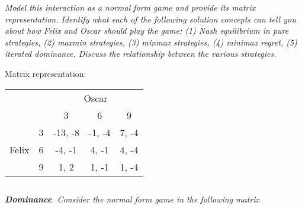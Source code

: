 \documentclass[12pt]{amsart}
\begin{document}
\textit{Model this interaction as a normal form game and provide its matrix representation.
	Identify what each of the following solution concepts can tell you about how Felix and Oscar
	should play the game: (1) Nash equilibrium in pure strategies, (2) maxmin strategies, (3)
	minmax strategies, (4) minimax regret, (5) iterated dominance. Discuss the relationship
	between the various strategies.}
	
	Matrix representation: \\
	
	\begin{center}
		\def\arraystretch{1.25}%
		\begin{tabular}{ccccc}
			&                        & \multicolumn{3}{c}{Oscar}                                                               \\
			& \multicolumn{1}{c|}{}  & \multicolumn{1}{c|}{3}       & \multicolumn{1}{c|}{6}      & \multicolumn{1}{c|}{9}     \\ \cline{2-5} 
			\multirow{3}{*}{Felix} & \multicolumn{1}{c|}{3} & \multicolumn{1}{c|}{-13, -8} & \multicolumn{1}{c|}{-1, -4} & \multicolumn{1}{c|}{7, -4} \\ \cline{2-5} 
			& \multicolumn{1}{c|}{6} & \multicolumn{1}{c|}{-4, -1}  & \multicolumn{1}{c|}{4, -1}  & \multicolumn{1}{c|}{4, -4} \\ \cline{2-5} 
			& \multicolumn{1}{c|}{9} & \multicolumn{1}{c|}{1, 2}    & \multicolumn{1}{c|}{1, -1}  & \multicolumn{1}{c|}{1, -4} \\ \cline{2-5} 
		\end{tabular}
	\end{center}
	
	\textbf{}


\subsection{}
\textit{\textbf{Dominance}. Consider the normal form game in the following matrix}
\end{document}
